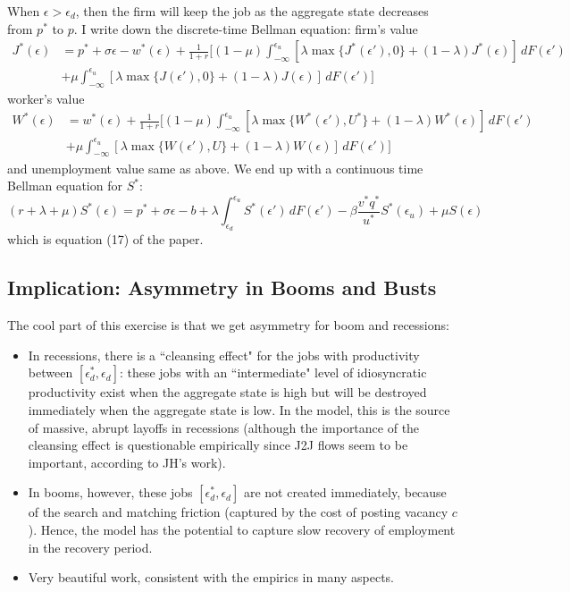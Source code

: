 \documentclass[12pt]{article}
\begin{document}
When $\epsilon > \epsilon_d$, then the firm will keep the job as the aggregate state decreases from $p^*$ to $p$. I write down the discrete-time Bellman equation: firm's value
\begin{align}
	J^*(\epsilon) & = p^* + \sigma \epsilon - w^*(\epsilon) + \frac{1}{1+r} \Bigg[(1-\mu) \int_{-\infty}^{\epsilon_u} [\lambda \max\{J^*(\epsilon'), 0\} + (1-\lambda) J^*(\epsilon)] \, dF(\epsilon')  \nonumber \\
	& + \mu \int_{-\infty}^{\epsilon_u} [\lambda \max\{J(\epsilon'), 0\} + (1-\lambda) J(\epsilon)] \, dF(\epsilon') \Bigg]
\end{align}
worker's value
\begin{align}
	W^*(\epsilon) & = w^*(\epsilon) + \frac{1}{1+r} \Bigg[(1-\mu) \int_{-\infty}^{\epsilon_u} [\lambda \max\{W^*(\epsilon'), U^*\} + (1-\lambda) W^*(\epsilon)] \, dF(\epsilon')  \nonumber \\
	& + \mu \int_{-\infty}^{\epsilon_u} [\lambda \max\{W(\epsilon'), U\} + (1-\lambda) W(\epsilon)] \, dF(\epsilon') \Bigg]
\end{align}
and unemployment value same as above. We end up with a continuous time Bellman equation for $S^*$:
\begin{equation}
	(r + \lambda + \mu) S^*(\epsilon) = p^* + \sigma \epsilon - b + \lambda \int_{\epsilon_d}^{\epsilon_u} S^*(\epsilon')\, d F(\epsilon') - \beta \frac{v^*q^*}{u^*} S^*(\epsilon_u) + \mu S(\epsilon)
\end{equation}
which is equation (17) of the paper. 

\subsection{Implication: Asymmetry in Booms and Busts}

The cool part of this exercise is that we get asymmetry for boom and recessions:
\begin{itemize}
	\item In recessions, there is a ``cleansing effect" for the jobs with productivity between $[\epsilon_d^*, \epsilon_d]$: these jobs with an ``intermediate" level of idiosyncratic productivity exist when the aggregate state is high but will be destroyed immediately when the aggregate state is low. In the model, this is the source of massive, abrupt layoffs in recessions (although the importance of the cleansing effect is questionable empirically since J2J flows seem to be important, according to JH's work). 
	\item In booms, however, these jobs $[\epsilon_d^*, \epsilon_d]$ are not created immediately, because of the search and matching friction (captured by the cost of posting vacancy $c$). Hence, the model has the potential to capture slow recovery of employment in the recovery period.
	\item Very beautiful work, consistent with the empirics in many aspects.   
\end{itemize}
 
\end{document}
